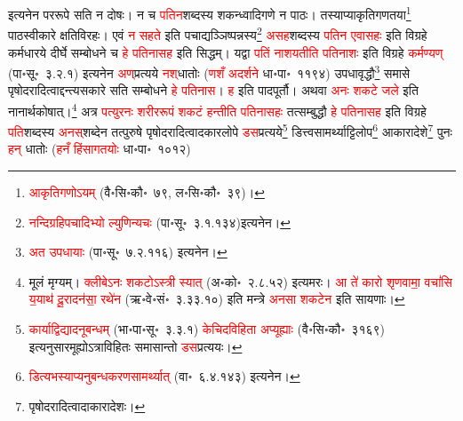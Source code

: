 \begin{sloppypar}
इत्यनेन पर\-रूपे सति न दोषः। न च \textcolor{red}{पतिन}\-शब्दस्य शकन्ध्वादि\-गणे न पाठः। तस्याप्याकृति\-गणतया\footnote{\textcolor{red}{आकृतिगणोऽयम्} (वै॰सि॰कौ॰~७९, ल॰सि॰कौ॰~३९)।} पाठ\-स्वीकारे क्षति\-विरहः। एवं \textcolor{red}{न सहते} इति पचाद्यञ्ञिष्पन्नस्य\footnote{\textcolor{red}{नन्दि\-ग्रहि\-पचादिभ्यो ल्युणिन्यचः} (पा॰सू॰~३.१.१३४)इत्यनेन।} \textcolor{red}{असह}\-शब्दस्य \textcolor{red}{पतिन एवासहः} इति विग्रहे कर्मधारये दीर्घे सम्बोधने च \textcolor{red}{हे पतिनासह} इति सिद्धम्। यद्वा \textcolor{red}{पतिं नाशयतीति पति\-नाशः} इति विग्रहे \textcolor{red}{कर्मण्यण्‌} (पा॰सू॰~३.२.१) इत्यनेन \textcolor{red}{अण्‌}प्रत्यये \textcolor{red}{नश्‌}\-धातोः (\textcolor{red}{णशँ अदर्शने} धा॰पा॰~११९४) उपधा\-वृद्धौ\footnote{\textcolor{red}{अत उपधायाः} (पा॰सू॰~७.२.११६) इत्यनेन।} समासे पृषोदरादित्वाद्दन्त्य\-सकारे सति सम्बोधने \textcolor{red}{हे पति\-नास}। \textcolor{red}{ह} इति पाद\-पूर्तौ। अथवा \textcolor{red}{अनः शकटे जले} इति नानार्थ\-कोषात्।\footnote{मूलं मृग्यम्। \textcolor{red}{क्लीबेऽनः शकटोऽस्त्री स्यात्} (अ॰को॰~२.८.५२) इत्यमरः। \textcolor{red}{आ ते॑ कारो शृणवामा॒ वचां॑सि य॒याथ॑ दू॒रादन॑सा॒ रथे॑न} (ऋ॰वे॰सं॰~३.३३.१०) इति मन्त्रे \textcolor{red}{अनसा शकटेन} इति सायणाः।} अत्र \textcolor{red}{पत्युरनः शरीर\-रूपं शकटं हन्तीति पतिनासहः} तत्सम्बुद्धौ \textcolor{red}{हे पतिनासह} इति विग्रहे \textcolor{red}{पति}\-शब्दस्य \textcolor{red}{अनस्‌}\-शब्देन तत्पुरुषे पृषोदरादित्वादकार\-लोपे \textcolor{red}{डस}\-प्रत्यये\footnote{\textcolor{red}{कार्याद्विद्यादनूबन्धम्} (भा॰पा॰सू॰~३.३.१) \textcolor{red}{केचिदविहिता अप्यूह्याः} (वै॰सि॰कौ॰~३१६९) इत्यनुसारमूह्योऽ\-त्राविहितः समासान्तो \textcolor{red}{डस}\-प्रत्ययः।} डित्त्वसामर्थ्याट्टिलोप\footnote{\textcolor{red}{डित्यभस्याप्यनु\-बन्धकरण\-सामर्थ्यात्‌} (वा॰~६.४.१४३) इत्यनेन।} आकारादेशे\footnote{पृषोदरादित्वादाकारादेशः।} पुनः \textcolor{red}{हन्‌} धातोः (\textcolor{red}{हनँ हिंसा\-गतयोः} धा॰पा॰~१०१२)

\end{sloppypar}
